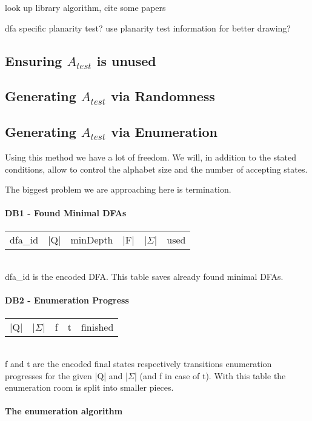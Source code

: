 \documentclass[a4paper, oneside, 11pt]{report}
\theoremstyle{definition}
\theoremstyle{remark}
\begin{document}
look up library algorithm, cite some papers

dfa specific planarity test?
use planarity test information for better drawing?

\subsection{Ensuring $A_{test}$ is unused}

\subsection{Generating $A_{test}$ via Randomness}

\subsection{Generating $A_{test}$ via Enumeration}

Using this method we have a lot of freedom. We will, in addition to the stated conditions, allow to control the alphabet size and the number of accepting states.

The biggest problem we are approaching here is termination.

\paragraph*{DB1 - Found Minimal DFAs}

\begin{tabular}{c c c c c c}
	dfa\_id & |Q| & minDepth & |F| & |$\Sigma$| & used
\end{tabular}\\
dfa\_id is the encoded DFA. This table saves already found minimal DFAs.

\paragraph*{DB2 - Enumeration Progress}

\begin{tabular}{c c c c c}
	|Q| & |$\Sigma$| & f & t & finished
\end{tabular}\\
f and t are the encoded final states respectively transitions enumeration progresses for the given |Q| and |$\Sigma$| (and f in case of t). With this table the enumeration room is split into smaller pieces.

\paragraph*{The enumeration algorithm}
\end{document}
